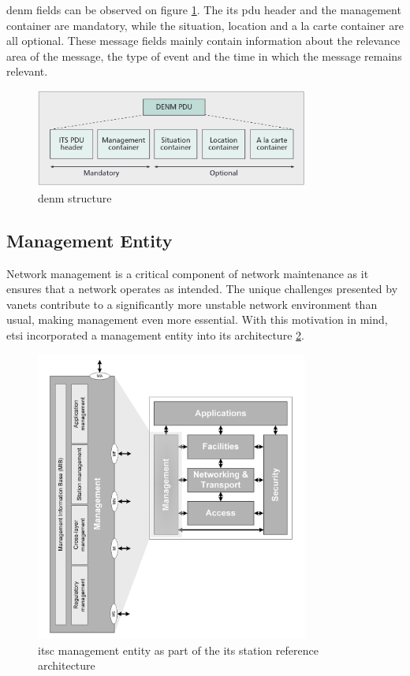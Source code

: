 \gls{denm} fields can be observed on figure \ref{fig:denm_structure}. The \gls{its} \gls{pdu} header and the management container are mandatory, while the situation, location and a la carte container are all optional. These message fields mainly contain information about the relevance area of the message, the type of event and the time in which the message remains relevant.\cite{al-sultan_comprehensive_2014}

\begin{figure}[htbp]
    \centering
    \includegraphics[width=0.8\textwidth]{Chapters/Figures/VANETs/denm_structure.png}
   	\caption{\gls{denm} structure~\cite{festag_cooperative_2014}}
   	\label{fig:denm_structure}
\end{figure}


\subsection[Management Entity]{Management Entity}
\label{subsec:Security_of_VANETs}
Network management is a critical component of network maintenance as it ensures that a network operates as intended. The unique challenges presented by \glspl{vanet} contribute to a significantly more unstable network environment than usual, making management even more essential. With this motivation in mind, \gls{etsi} incorporated a management entity into its architecture \ref{fig:management_entity}.

\begin{figure}[htbp]
\centering
\includegraphics[width=0.8\textwidth]{Chapters/Figures/VANETs/management_entity.png}
   	\caption{\gls{itsc} management entity as part of the \gls{its} station reference architecture~\cite{etsi_intelligent_2010}}
   	\label{fig:management_entity}
\end{figure}


